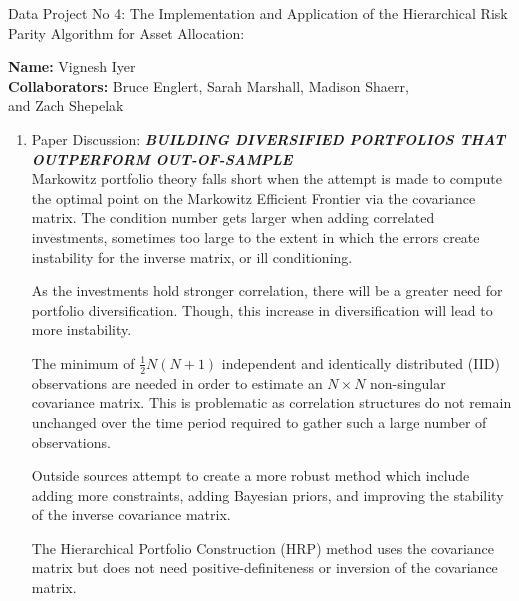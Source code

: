 \documentclass[12pt]{article}
\begin{document}
 
\begin{title}
{Data Project No 4: The Implementation and Application of the Hierarchical Risk Parity Algorithm for Asset Allocation:}
\end{title}
\begin{author}
{\textbf{Name:} Vignesh Iyer
\\ \textbf{Collaborators:} Bruce Englert, Sarah Marshall, Madison Shaerr, \\and Zach Shepelak}
\end{author}
\maketitle

\begin{enumerate}

\item{Paper Discussion: \textbf{\textit{BUILDING DIVERSIFIED PORTFOLIOS THAT OUTPERFORM OUT-OF-SAMPLE}}}
\\Markowitz portfolio theory falls short when the attempt is made to compute the optimal point on the Markowitz Efficient Frontier via the covariance matrix. The condition number gets larger when adding correlated investments, sometimes too large to the extent in which the errors create instability for the inverse matrix, or ill conditioning. 

As the investments hold stronger correlation, there will be a greater need for portfolio diversification. Though, this increase in diversification will lead to more instability.

The minimum of $\frac{1}{2}N(N+1)$ independent and identically distributed (IID) observations are needed in order to estimate an $N \times N$ non-singular covariance matrix. This is problematic as correlation structures do not remain unchanged over the time period required to gather such a large number of observations.

Outside sources attempt to create a more robust method which include adding more constraints, adding Bayesian priors, and improving the stability of the inverse covariance matrix.

The Hierarchical Portfolio Construction (HRP) method uses the covariance matrix but does not need positive-definiteness or inversion of the covariance matrix.


\end{enumerate}
\end{document}
